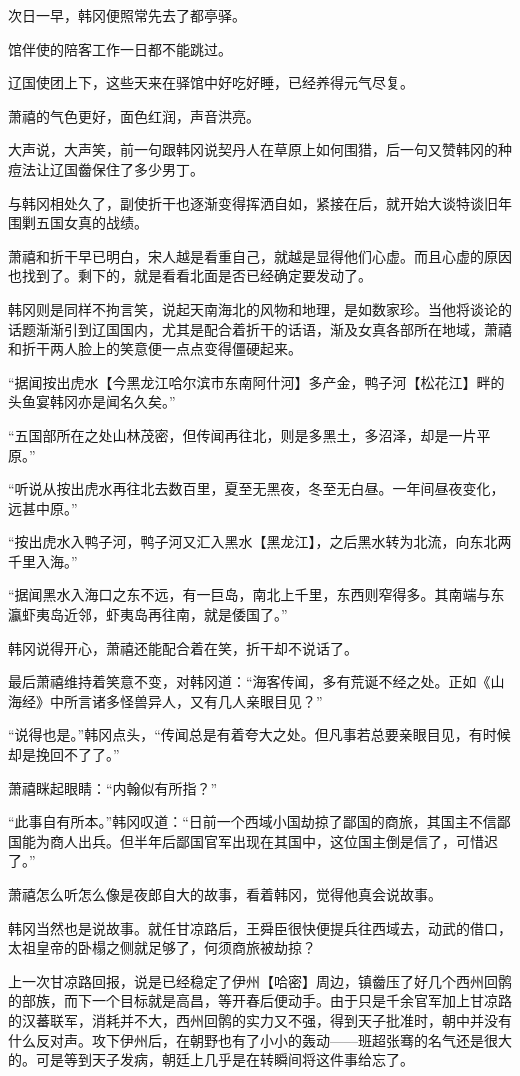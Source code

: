 次日一早，韩冈便照常先去了都亭驿。

馆伴使的陪客工作一日都不能跳过。

辽国使团上下，这些天来在驿馆中好吃好睡，已经养得元气尽复。

萧禧的气色更好，面色红润，声音洪亮。

大声说，大声笑，前一句跟韩冈说契丹人在草原上如何围猎，后一句又赞韩冈的种痘法让辽国齤保住了多少男丁。

与韩冈相处久了，副使折干也逐渐变得挥洒自如，紧接在后，就开始大谈特谈旧年围剿五国女真的战绩。

萧禧和折干早已明白，宋人越是看重自己，就越是显得他们心虚。而且心虚的原因也找到了。剩下的，就是看看北面是否已经确定要发动了。

韩冈则是同样不拘言笑，说起天南海北的风物和地理，是如数家珍。当他将谈论的话题渐渐引到辽国国内，尤其是配合着折干的话语，渐及女真各部所在地域，萧禧和折干两人脸上的笑意便一点点变得僵硬起来。

“据闻按出虎水【今黑龙江哈尔滨市东南阿什河】多产金，鸭子河【松花江】畔的头鱼宴韩冈亦是闻名久矣。”

“五国部所在之处山林茂密，但传闻再往北，则是多黑土，多沼泽，却是一片平原。”

“听说从按出虎水再往北去数百里，夏至无黑夜，冬至无白昼。一年间昼夜变化，远甚中原。”

“按出虎水入鸭子河，鸭子河又汇入黑水【黑龙江】，之后黑水转为北流，向东北两千里入海。”

“据闻黑水入海口之东不远，有一巨岛，南北上千里，东西则窄得多。其南端与东瀛虾夷岛近邻，虾夷岛再往南，就是倭国了。”

韩冈说得开心，萧禧还能配合着在笑，折干却不说话了。

最后萧禧维持着笑意不变，对韩冈道：“海客传闻，多有荒诞不经之处。正如《山海经》中所言诸多怪兽异人，又有几人亲眼目见？”

“说得也是。”韩冈点头，“传闻总是有着夸大之处。但凡事若总要亲眼目见，有时候却是挽回不了了。”

萧禧眯起眼睛：“内翰似有所指？”

“此事自有所本。”韩冈叹道：“日前一个西域小国劫掠了鄙国的商旅，其国主不信鄙国能为商人出兵。但半年后鄙国官军出现在其国中，这位国主倒是信了，可惜迟了。”

萧禧怎么听怎么像是夜郎自大的故事，看着韩冈，觉得他真会说故事。

韩冈当然也是说故事。就任甘凉路后，王舜臣很快便提兵往西域去，动武的借口，太祖皇帝的卧榻之侧就足够了，何须商旅被劫掠？

上一次甘凉路回报，说是已经稳定了伊州【哈密】周边，镇齤压了好几个西州回鹘的部族，而下一个目标就是高昌，等开春后便动手。由于只是千余官军加上甘凉路的汉蕃联军，消耗并不大，西州回鹘的实力又不强，得到天子批准时，朝中并没有什么反对声。攻下伊州后，在朝野也有了小小的轰动——班超张骞的名气还是很大的。可是等到天子发病，朝廷上几乎是在转瞬间将这件事给忘了。

